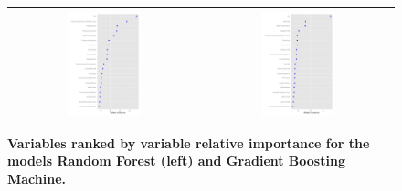 \documentclass[8pt]{article}
\begin{document}
\begin{figure}[htb]
	\begin{center}
		\begin{tabular}{|c|c|}\hline 
			\includegraphics[width = 0.4\textwidth]{results/rf-importance.pdf} & 
			\includegraphics[width = 0.4\textwidth]{results/gbm-importance.pdf} \\ \hline
		\end{tabular}
		\caption{{\bf Variables ranked by variable relative importance for the models Random Forest (left) and Gradient Boosting Machine.}}
		\label{fig:importance}
	\end{center}
\end{figure}

\end{document}
